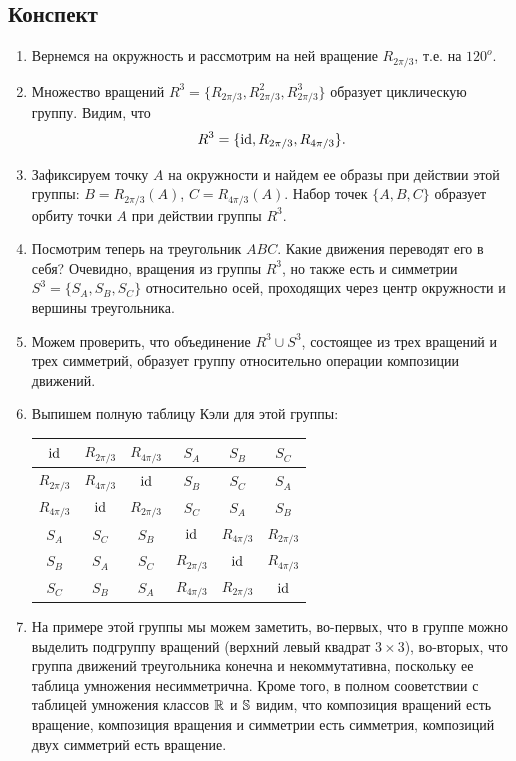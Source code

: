\subsection*{Конспект}
\begin{enumerate}\setlength{\itemsep}{1pt}
\item Вернемся на окружность и рассмотрим на ней вращение $R_{2\pi/3}$, т.е. на $120^o$.
\item Множество вращений $R^3=\{R_{2\pi/3},R_{2\pi/3}^2,R_{2\pi/3}^3\}$ образует циклическую группу. Видим, что
$$
R^3 = \{\id,R_{2\pi/3},R_{4\pi/3}\}.
$$
\item Зафиксируем точку $A$ на окружности и найдем ее образы при действии этой группы: $B=R_{2\pi/3}(A)$, $C=R_{4\pi/3}(A)$. Набор точек $\{A,B,C\}$ образует орбиту точки $A$ при действии группы $R^3$.
\item Посмотрим теперь на треугольник $ABC$. Какие движения переводят его в себя? Очевидно, вращения из группы $R^3$, но также есть и симметрии $S^3=\{S_A, S_B, S_C\}$ относительно осей, проходящих через центр окружности и вершины треугольника.
\item Можем проверить, что объединение $R^3\cup S^3$, состоящее из трех вращений и трех симметрий, образует группу относительно операции композиции движений.
\item Выпишем полную таблицу Кэли для этой группы:
\begin{table}[htb!]\begin{center}
\begin{tabular}{|c|c|c||c|c|c|}
\hline
$\id$        & $R_{2\pi/3}$ & $R_{4\pi/3}$ & $S_A$        & $S_B$        & $S_C$  \\  \hline
$R_{2\pi/3}$ & $R_{4\pi/3}$ & $\id$        & $S_B$        & $S_C$        & $S_A$  \\  \hline
$R_{4\pi/3}$ & $\id$        & $R_{2\pi/3}$ & $S_C$        & $S_A$        & $S_B$  \\  \hline\hline
$S_A$        & $S_C$        & $S_B$        & $\id$        & $R_{4\pi/3}$ & $R_{2\pi/3}$  \\  \hline
$S_B$        & $S_A$        & $S_C$        & $R_{2\pi/3}$ & $\id$        & $R_{4\pi/3}$  \\  \hline
$S_C$        & $S_B$        & $S_A$        & $R_{4\pi/3}$ & $R_{2\pi/3}$ & $\id$   \\  \hline
\end{tabular}
\end{center}\end{table}
\item На примере этой группы мы можем заметить, во-первых, что в группе можно выделить подгруппу вращений (верхний левый квадрат $3\times 3$), во-вторых, что группа движений треугольника конечна и некоммутативна, поскольку ее таблица умножения несимметрична. Кроме того, в полном сооветствии с таблицей умножения классов $\R$ и $\S$ видим, что композиция вращений есть вращение, композиция вращения и симметрии есть симметрия, композиций двух симметрий есть вращение.

\end{enumerate}
